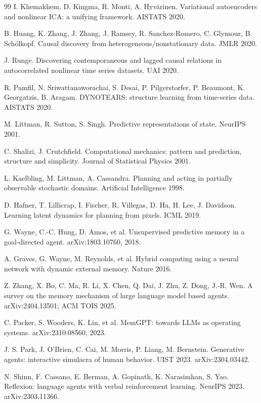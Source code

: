 \documentclass[11pt]{article}
\theoremstyle{plain}
\theoremstyle{definition}
\begin{document}
\begin{thebibliography}{99}
 I. Khemakhem, D. Kingma, R. Monti, A. Hyv\"arinen. Variational autoencoders and nonlinear ICA: a unifying framework. AISTATS 2020.

 B. Huang, K. Zhang, J. Zhang, J. Ramsey, R. Sanchez-Romero, C. Glymour, B. Sch\"olkopf. Causal discovery from heterogeneous/nonstationary data. JMLR 2020.

 J. Runge. Discovering contemporaneous and lagged causal relations in autocorrelated nonlinear time series datasets. UAI 2020.

 R. Pamfil, N. Sriwattanaworachai, S. Desai, P. Pilgerstorfer, P. Beaumont, K. Georgatzis, B. Aragam. DYNOTEARS: structure learning from time-series data. AISTATS 2020.

 M. Littman, R. Sutton, S. Singh. Predictive representations of state. NeurIPS 2001.

 C. Shalizi, J. Crutchfield. Computational mechanics: pattern and prediction, structure and simplicity. Journal of Statistical Physics 2001.

 L. Kaelbling, M. Littman, A. Cassandra. Planning and acting in partially observable stochastic domains. Artificial Intelligence 1998.

 D. Hafner, T. Lillicrap, I. Fischer, R. Villegas, D. Ha, H. Lee, J. Davidson. Learning latent dynamics for planning from pixels. ICML 2019.

 G. Wayne, C.-C. Hung, D. Amos, et al. Unsupervised predictive memory in a goal-directed agent. arXiv:1803.10760, 2018.

 A. Graves, G. Wayne, M. Reynolds, et al. Hybrid computing using a neural network with dynamic external memory. Nature 2016.

 Z. Zhang, X. Bo, C. Ma, R. Li, X. Chen, Q. Dai, J. Zhu, Z. Dong, J.-R. Wen. A survey on the memory mechanism of large language model based agents. arXiv:2404.13501; ACM TOIS 2025.

 C. Packer, S. Wooders, K. Lin, et al. MemGPT: towards LLMs as operating systems. arXiv:2310.08560, 2023.

 J. S. Park, J. O'Brien, C. Cai, M. Morris, P. Liang, M. Bernstein. Generative agents: interactive simulacra of human behavior. UIST 2023. arXiv:2304.03442.

 N. Shinn, F. Cassano, E. Berman, A. Gopinath, K. Narasimhan, S. Yao. Reflexion: language agents with verbal reinforcement learning. NeurIPS 2023. arXiv:2303.11366.


\end{thebibliography}
\end{document}
